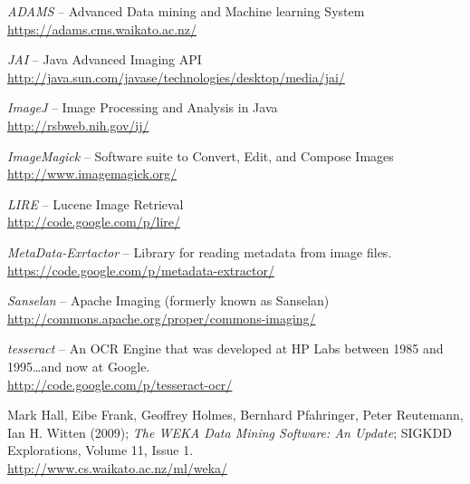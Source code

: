 %

\begin{thebibliography}{999}

		\textit{ADAMS} -- Advanced Data mining and Machine learning System \\
		\url{https://adams.cms.waikato.ac.nz/}{}

	 	\textit{JAI} -- Java Advanced Imaging API \\
		\url{http://java.sun.com/javase/technologies/desktop/media/jai/}{}

		\textit{ImageJ} -- Image Processing and Analysis in Java \\
		\url{http://rsbweb.nih.gov/ij/}{}

		\textit{ImageMagick} -- Software suite to Convert, Edit, and Compose Images \\
		\url{http://www.imagemagick.org/}{}

		\textit{LIRE} -- Lucene Image Retrieval \\
		\url{http://code.google.com/p/lire/}{}

		\textit{MetaData-Exrtactor} -- Library for reading metadata from image files.  \\
		\url{https://code.google.com/p/metadata-extractor/}{}

		\textit{Sanselan} -- Apache Imaging (formerly known as Sanselan) \\
		\url{http://commons.apache.org/proper/commons-imaging/}{}

		\textit{tesseract} -- An OCR Engine that was developed at HP Labs between 1985 and 1995\ldots and now at Google. \\
		\url{http://code.google.com/p/tesseract-ocr/}{}

	 	Mark Hall, Eibe Frank, Geoffrey Holmes, Bernhard Pfahringer, Peter
	 	Reutemann, Ian H. Witten (2009); \textit{The WEKA Data Mining Software: An
	 	Update}; SIGKDD Explorations, Volume 11, Issue 1. \\
		\url{http://www.cs.waikato.ac.nz/ml/weka/}{}

\end{thebibliography}
